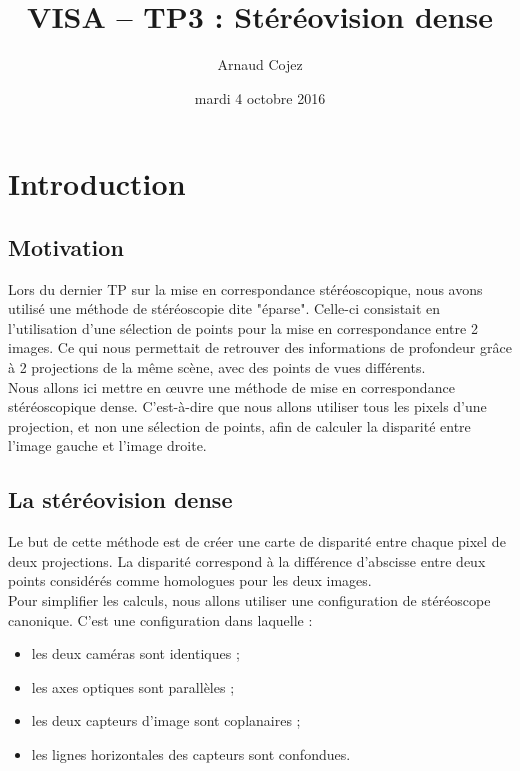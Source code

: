 \documentclass[a4paper]{article}
\begin{document}
\title{VISA -- TP3 : Stéréovision dense}
\author{Arnaud Cojez}
\date{mardi 4 octobre 2016}

\maketitle

\newpage
\tableofcontents
\newpage

\section{Introduction}

\subsection{Motivation}
Lors du dernier TP sur la mise en correspondance stéréoscopique, nous avons utilisé une méthode de stéréoscopie dite "éparse". Celle-ci consistait en l'utilisation d'une sélection de points pour la mise en correspondance entre 2 images. Ce qui nous permettait de retrouver des informations de profondeur grâce à 2 projections de la même scène, avec des points de vues différents.\\

Nous allons ici mettre en œuvre une méthode de mise en correspondance stéréoscopique dense. C'est-à-dire que nous allons utiliser tous les pixels d'une projection, et non une sélection de points, afin de calculer la disparité entre l'image gauche et l'image droite.

\subsection{La stéréovision dense}
Le but de cette méthode est de créer une carte de disparité entre chaque pixel de deux projections. La disparité correspond à la différence d'abscisse entre deux points considérés comme homologues pour les deux images.\\

Pour simplifier les calculs, nous allons utiliser une configuration de stéréoscope canonique. C'est une configuration dans laquelle :
\begin{itemize}
\item les deux caméras sont identiques ;
\item les axes optiques sont parallèles ;
\item les deux capteurs d’image sont coplanaires ;
\item les lignes horizontales des capteurs sont confondues.\\
\end{itemize}
\end{document}

